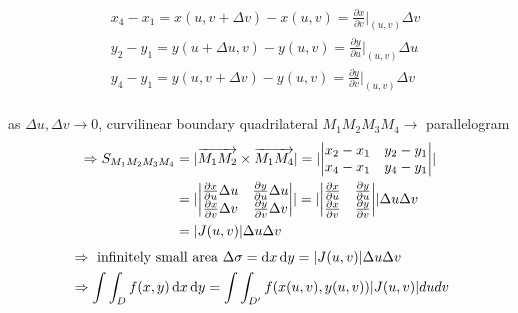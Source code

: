 \begin{itemize}
\begin{itemize}
\begin{itemize}
\begin{align*}
		&x_4 - x_1 = x(u, v+\Delta v) - x(u,v) = \frac {\partial x}{\partial v}\rvert_{(u,v)} \Delta v \\
		&y_2 - y_1 = y(u+\Delta u, v) - y(u,v) = \frac {\partial y}{\partial u}\rvert_{(u,v)} \Delta u \\
		&y_4 - y_1 = y(u, v+\Delta v) - y(u,v) = \frac {\partial y}{\partial v}\rvert_{(u,v)} \Delta v
		\end{align*} \\
		as $\Delta u, \Delta v \rightarrow 0$, curvilinear boundary quadrilateral $M_1M_2M_3M_4 \rightarrow$ parallelogram %
		\begin{align*}
		\Rightarrow S_{M_1M_2M_3M_4} &= \lvert\overrightarrow{M_1M_2} \times \overrightarrow{M_1M_4}\rvert = \lvert\begin{vmatrix} x_2-x_1 & y_2-y_1 \\ x_4-x_1 & y_4-y_1 \end{vmatrix}\rvert \\&= \lvert \begin{vmatrix} \frac {\partial x}{\partial u} \Delta u & \frac {\partial y}{\partial u} \Delta u \\ \frac {\partial x}{\partial v} \Delta v & \frac {\partial y}{\partial v} \Delta v \end{vmatrix} \rvert = \lvert\begin{vmatrix} \frac {\partial x}{\partial u} & \frac {\partial y}{\partial u} \\ \frac {\partial x}{\partial v} & \frac {\partial y}{\partial v} \end{vmatrix}\rvert \Delta u\Delta v \\ &= \lvert J(u,v)\rvert\Delta u\Delta v 
		\end{align*}
		\Item \begin{align*} &\Rightarrow \text{ infinitely small area } \Delta \sigma = \mathop{}\!\mathrm{d} x\mathop{}\!\mathrm{d} y = \lvert J(u,v)\rvert\Delta u\Delta v \\ &\Rightarrow \int\int_D f(x,y) \mathop{}\!\mathrm{d} x\mathop{}\!\mathrm{d} y = \int\int_{D'} f(x(u,v), y(u,v)) |J(u,v)| dudv \end{align*}
		

\end{itemize}
\end{itemize}
\end{itemize}
